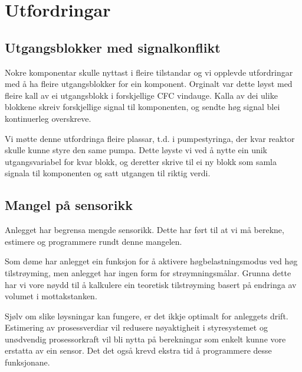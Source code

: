 \section{Utfordringar}
\thispagestyle{fancy}

\subsection{Utgangsblokker med signalkonflikt}
Nokre komponentar skulle nyttast i fleire tilstandar og vi opplevde 
utfordringar med å ha fleire utgangsblokker for ein komponent.
Orginalt var dette løyst med fleire kall av ei utgangsblokk i forskjellige \gls{CFC} vindauge.
Kalla av dei ulike blokkene skreiv forskjellige signal til komponenten, og
sendte høg signal blei kontinuerleg overskreve.

Vi møtte denne utfordringa fleire plassar, t.d. i pumpestyringa,
der kvar reaktor skulle kunne styre den same pumpa.
Dette løyste vi ved å nytte ein unik utgangsvariabel for kvar blokk, 
og deretter skrive til ei ny blokk som samla signala til komponenten og satt utgangen til riktig verdi.

\subsection{Mangel på sensorikk}

Anlegget har begrensa mengde sensorikk. 
Dette har ført til at vi må berekne, estimere og programmere rundt denne mangelen.

Som døme har anlegget ein funksjon for å aktivere
høgbelastningsmodus ved høg tilstrøyming, 
men anlegget har ingen form for strøymningsmålar.\newline
Grunna dette har vi vore nøydd til å kalkulere ein teoretisk tilstrøyming basert på endringa av volumet i mottakstanken.

Sjølv om slike løysningar kan fungere, er det ikkje optimalt for anleggets drift.
Estimering av prosessverdiar vil redusere nøyaktigheit i styresystemet og
unødvendig prosessorkraft vil bli nytta på berekningar som enkelt kunne vore erstatta av ein sensor.\newline
Det det også krevd ekstra tid å programmere desse funksjonane.


